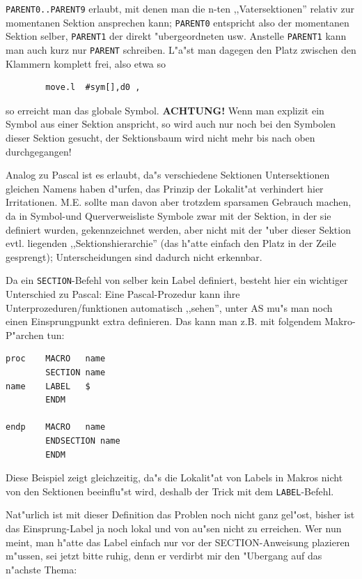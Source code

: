 \documentclass[12pt,a4paper,twoside]{report}
\newcommand{\bb}[1]{{\bf #1}}
\newcommand{\tty}[1]{{\tt #1}}
\newcommand{\asname}{AS}
\begin{document}
\tty{PARENT0..PARENT9} erlaubt, mit denen man die n-ten ,,Vatersektionen''
relativ zur momentanen Sektion ansprechen kann; \tty{PARENT0} entspricht
also der momentanen Sektion selber, \tty{PARENT1} der direkt "ubergeordneten
usw.  Anstelle \tty{PARENT1} kann man auch kurz nur \tty{PARENT} schreiben.
L"a"st man dagegen den Platz zwischen den Klammern komplett frei, also
etwa so
\begin{verbatim}
        move.l  #sym[],d0 ,
\end{verbatim}
so erreicht man das globale Symbol.  \bb{ACHTUNG!} Wenn man explizit ein
Symbol aus einer Sektion anspricht, so wird auch nur noch bei den
Symbolen dieser Sektion gesucht, der Sektionsbaum wird nicht mehr
bis nach oben durchgegangen!
\par
Analog zu Pascal ist es erlaubt, da"s verschiedene Sektionen Untersektionen
gleichen Namens haben d"urfen, das Prinzip der Lokalit"at verhindert hier
Irritationen.  M.E. sollte man davon aber trotzdem sparsamen Gebrauch machen,
da in Symbol-und Querverweisliste Symbole zwar mit der Sektion, in der sie
definiert wurden, gekennzeichnet werden, aber nicht mit der "uber dieser
Sektion evtl. liegenden ,,Sektionshierarchie'' (das h"atte einfach den Platz
in der Zeile gesprengt); Unterscheidungen sind dadurch nicht erkennbar.
\par
Da ein \tty{SECTION}-Befehl von selber kein Label definiert, besteht hier
ein wichtiger Unterschied zu Pascal: Eine Pascal-Prozedur kann
ihre Unterprozeduren/funktionen automatisch ,,sehen'', unter \asname{} mu"s man
noch einen Einsprungpunkt extra definieren.  Das kann man z.B. mit folgendem
Makro-P"archen tun:
\begin{verbatim}
proc    MACRO   name
        SECTION name
name    LABEL   $
        ENDM

endp    MACRO   name
        ENDSECTION name
        ENDM
\end{verbatim}
Diese Beispiel zeigt gleichzeitig, da"s die Lokalit"at von Labels in
Makros nicht von den Sektionen beeinflu"st wird, deshalb der Trick mit dem
\tty{LABEL}-Befehl.
\par
Nat"urlich ist mit dieser Definition das Problen noch nicht ganz gel"ost,
bisher ist das Einsprung-Label ja noch lokal und von au"sen nicht zu
erreichen.  Wer nun meint, man h"atte das Label einfach nur vor der
SECTION-Anweisung plazieren m"ussen, sei jetzt bitte ruhig, denn er
verdirbt mir den "Ubergang auf das n"achste Thema:

\end{document}
